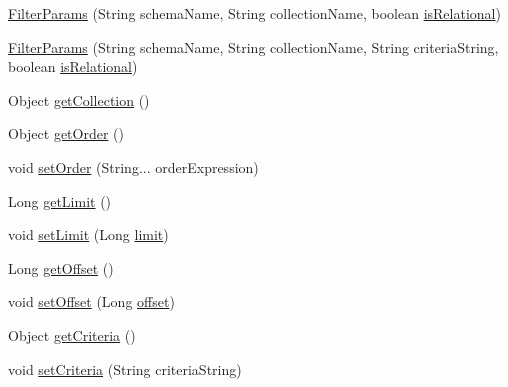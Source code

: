 \begin{DoxyCompactItemize}
\item 
\mbox{\hyperlink{classcom_1_1mysql_1_1cj_1_1xdevapi_1_1_filter_params_a0a6b829d7c55322955dc4cdbe1ca3597}{Filter\+Params}} (String schema\+Name, String collection\+Name, boolean \mbox{\hyperlink{classcom_1_1mysql_1_1cj_1_1xdevapi_1_1_filter_params_a0224c120aec3648050bdf39abf891859}{is\+Relational}})
\item 
\mbox{\hyperlink{classcom_1_1mysql_1_1cj_1_1xdevapi_1_1_filter_params_a86e55942c70571c91908ac078da602ec}{Filter\+Params}} (String schema\+Name, String collection\+Name, String criteria\+String, boolean \mbox{\hyperlink{classcom_1_1mysql_1_1cj_1_1xdevapi_1_1_filter_params_a0224c120aec3648050bdf39abf891859}{is\+Relational}})
\item 
Object \mbox{\hyperlink{classcom_1_1mysql_1_1cj_1_1xdevapi_1_1_filter_params_a0c094607246b4c286936320aa6bc8730}{get\+Collection}} ()
\item 
Object \mbox{\hyperlink{classcom_1_1mysql_1_1cj_1_1xdevapi_1_1_filter_params_a320a299b52146e1a58f2f6db7df9aaa4}{get\+Order}} ()
\item 
void \mbox{\hyperlink{classcom_1_1mysql_1_1cj_1_1xdevapi_1_1_filter_params_adf609cfc0701fb8ca9572cadbc22e585}{set\+Order}} (String... order\+Expression)
\item 
Long \mbox{\hyperlink{classcom_1_1mysql_1_1cj_1_1xdevapi_1_1_filter_params_a395e7d0fcff6c6ac0c4025378c545554}{get\+Limit}} ()
\item 
void \mbox{\hyperlink{classcom_1_1mysql_1_1cj_1_1xdevapi_1_1_filter_params_a2e40cc9cad6cc2c180885bce847dbd3e}{set\+Limit}} (Long \mbox{\hyperlink{classcom_1_1mysql_1_1cj_1_1xdevapi_1_1_filter_params_a280a8838cf2cf03e4263cafc7594c51f}{limit}})
\item 
Long \mbox{\hyperlink{classcom_1_1mysql_1_1cj_1_1xdevapi_1_1_filter_params_aacf85adccf9dea619e20dac249f186ca}{get\+Offset}} ()
\item 
void \mbox{\hyperlink{classcom_1_1mysql_1_1cj_1_1xdevapi_1_1_filter_params_a1156464704c5142e4130dde30dfb74b4}{set\+Offset}} (Long \mbox{\hyperlink{classcom_1_1mysql_1_1cj_1_1xdevapi_1_1_filter_params_ae5a7ad2d85c2332b4969cc3470c01352}{offset}})
\item 
Object \mbox{\hyperlink{classcom_1_1mysql_1_1cj_1_1xdevapi_1_1_filter_params_a298c93b71ac0764ce416f09aa090442f}{get\+Criteria}} ()
\item 
void \mbox{\hyperlink{classcom_1_1mysql_1_1cj_1_1xdevapi_1_1_filter_params_aa0ac8db4a35c529635ad8342376e8cc1}{set\+Criteria}} (String criteria\+String)

\end{DoxyCompactItemize}
